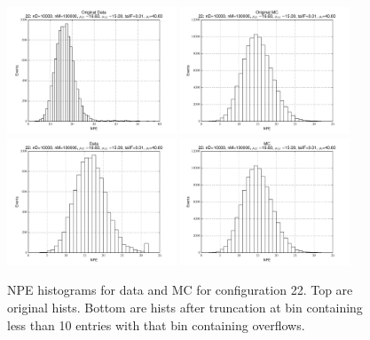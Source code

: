  \begin{figure}[htbp] \begin{center} 
\includegraphics[width=0.45\textwidth]{../FIGURES/22/FIG_Original_Data.pdf} 
\includegraphics[width=0.45\textwidth]{../FIGURES/22/FIG_Original_MC.pdf} 
\includegraphics[width=0.45\textwidth]{../FIGURES/22/FIG_Data.pdf} 
\includegraphics[width=0.45\textwidth]{../FIGURES/22/FIG_MC.pdf} 
\caption{NPE histograms for data and MC for configuration 22. Top are original hists. Bottom are hists after truncation at bin containing less than 10 entries with that bin containing overflows.} 
\label{tab:npe_22} 
\end{center} \end{figure} 

 
